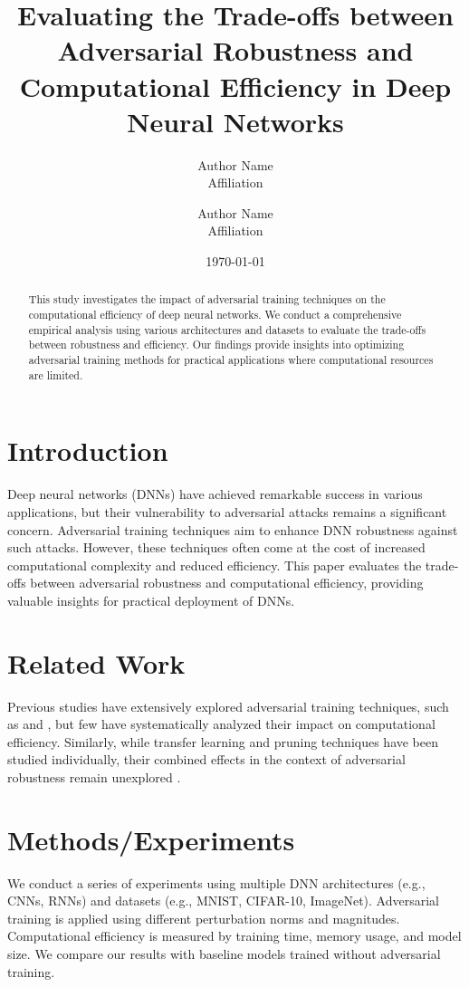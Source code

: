 \documentclass{article}
\begin{document}
\title{Evaluating the Trade-offs between Adversarial Robustness and Computational Efficiency in Deep Neural Networks}
\author{Author Name \\ \small Affiliation \\ \and Author Name \\ \small Affiliation}
\date{\today}
\maketitle

\begin{abstract}
This study investigates the impact of adversarial training techniques on the computational efficiency of deep neural networks. We conduct a comprehensive empirical analysis using various architectures and datasets to evaluate the trade-offs between robustness and efficiency. Our findings provide insights into optimizing adversarial training methods for practical applications where computational resources are limited.
\end{abstract}

\section{Introduction}
Deep neural networks (DNNs) have achieved remarkable success in various applications, but their vulnerability to adversarial attacks remains a significant concern. Adversarial training techniques aim to enhance DNN robustness against such attacks. However, these techniques often come at the cost of increased computational complexity and reduced efficiency. This paper evaluates the trade-offs between adversarial robustness and computational efficiency, providing valuable insights for practical deployment of DNNs.

\section{Related Work}
Previous studies have extensively explored adversarial training techniques, such as \cite{lee2023enhancing} and \cite{zhang2023comparative}, but few have systematically analyzed their impact on computational efficiency. Similarly, while transfer learning and pruning techniques have been studied individually, their combined effects in the context of adversarial robustness remain unexplored \cite{chen2023exploring, wu2023improving}.

\section{Methods/Experiments}
We conduct a series of experiments using multiple DNN architectures (e.g., CNNs, RNNs) and datasets (e.g., MNIST, CIFAR-10, ImageNet). Adversarial training is applied using different perturbation norms and magnitudes. Computational efficiency is measured by training time, memory usage, and model size. We compare our results with baseline models trained without adversarial training.
\end{document}

